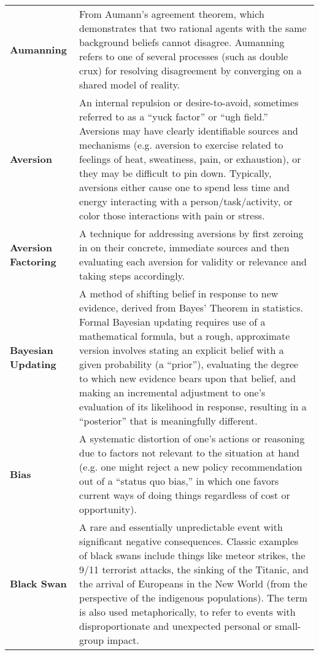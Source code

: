 \begin{longtable} { p{} p{} }
\textbf{Aumanning} & From Aumann's agreement theorem, which demonstrates that two rational agents with the same background beliefs cannot disagree.  Aumanning refers to one of several processes (such as double crux) for resolving disagreement by converging on a shared model of reality.\\

\textbf{Aversion} & An internal repulsion or desire-to-avoid, sometimes referred to as a ``yuck factor'' or ``ugh field.''  Aversions may have clearly identifiable sources and mechanisms (e.g. aversion to exercise related to feelings of heat, sweatiness, pain, or exhaustion), or they may be difficult to pin down.  Typically, aversions either cause one to spend less time and energy interacting with a person/task/activity, or color those interactions with pain or stress.\\

\textbf{Aversion Factoring} & A technique for addressing aversions by first zeroing in on their concrete, immediate sources and then evaluating each aversion for validity or relevance and taking steps accordingly.\\

\textbf{Bayesian Updating} & A method of shifting belief in response to new evidence, derived from Bayes' Theorem in statistics.  Formal Bayesian updating requires use of a mathematical formula, but a rough, approximate version involves stating an explicit belief with a given probability (a ``prior''), evaluating the degree to which new evidence bears upon that belief, and making an incremental adjustment to one's evaluation of its likelihood in response, resulting in a ``posterior'' that is meaningfully different.\\

\textbf{Bias} & A systematic distortion of one's actions or reasoning due to factors not relevant to the situation at hand (e.g. one might reject a new policy recommendation out of a ``status quo bias,'' in which one favors current ways of doing things regardless of cost or opportunity).\\

\textbf{Black Swan} & A rare and essentially unpredictable event with significant negative consequences.  Classic examples of black swans include things like meteor strikes, the 9/11 terrorist attacks, the sinking of the Titanic, and the arrival of Europeans in the New World (from the perspective of the indigenous populations).  The term is also used metaphorically, to refer to events with disproportionate and unexpected personal or small-group impact.\\


\end{longtable}

